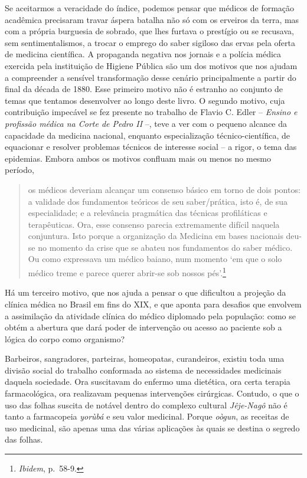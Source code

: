 Se aceitarmos a veracidade do índice, podemos pensar que médicos de
formação acadêmica precisaram travar áspera batalha não só com os
erveiros da terra, mas com a própria burguesia de sobrado, que lhes
furtava o prestígio ou se recusava, sem sentimentalismos, a trocar o
emprego do saber sigiloso das ervas pela oferta de medicina científica.
A propaganda negativa nos jornais e a polícia médica exercida pela
instituição de Higiene Pública são um dos motivos que nos ajudam a
compreender a sensível transformação desse cenário principalmente a
partir do final da década de 1880. Esse primeiro motivo não é estranho
ao conjunto de temas que tentamos desenvolver ao longo deste livro. O
segundo motivo, cuja contribuição impecável se fez presente no trabalho
de Flavio C. Edler -- \emph{Ensino e profissão médica na Corte de Pedro
II} --, teve a ver com o pequeno alcance da capacidade da medicina
nacional, enquanto especialização técnico-científica, de equacionar e
resolver problemas técnicos de interesse social -- a rigor, o tema das
epidemias. Embora ambos os motivos confluam mais ou menos no mesmo
período,

\begin{quote}
os médicos deveriam alcançar um consenso básico em torno de dois pontos:
a validade dos fundamentos teóricos de seu saber/prática, isto é, de sua
especialidade; e a relevância pragmática das técnicas profiláticas e
terapêuticas. Ora, esse consenso parecia extremamente difícil naquela
conjuntura. Isto porque a organização da Medicina em bases nacionais
deu-se no momento da crise que se abateu nos fundamentos do saber
médico. Ou como expressava um médico baiano, num momento `em que o solo
médico treme e parece querer abrir-se sob nossos pés'.\footnote{\emph{Ibidem},
  p.~58-9.}
\end{quote}

Há um terceiro motivo, que nos ajuda a pensar o que dificultou a
projeção da clínica médica no Brasil em fins do XIX, e que aponta para
desafios que envolvem a assimilação da atividade clínica do médico
diplomado pela população: como se obtém a abertura que dará poder de
intervenção ou acesso ao paciente sob a lógica do corpo como organismo?

Barbeiros, sangradores, parteiras, homeopatas, curandeiros, existiu toda
uma divisão social do trabalho conformada ao sistema de necessidades
medicinais daquela sociedade. Ora suscitavam do enfermo uma dietética,
ora certa terapia farmacológica, ora realizavam pequenas intervenções
cirúrgicas. Contudo, o que o uso das folhas suscita de notável dentro do
complexo cultural \emph{Jêje-Nagô} não é tanto a farmacopeia
\emph{yorùbá} e seu valor medicinal. Porque \emph{oògun}, as receitas de
uso medicinal, são apenas uma das várias aplicações às quais se destina
o segredo das folhas.

